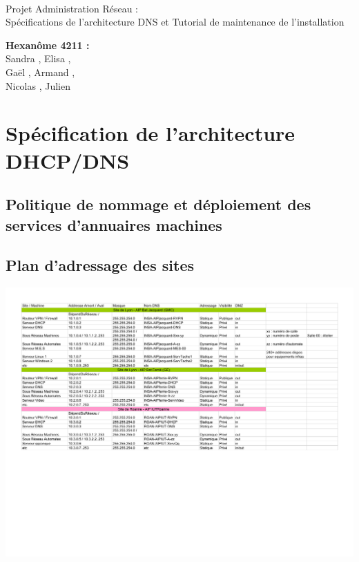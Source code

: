 \documentclass[a4paper]{article}
\begin{document}
\begin{titlepage}
	~ 
	\vfill
	\begin{center}
		\begin{Huge}
			Projet Administration Réseau : \\ Spécifications de l'architecture DNS et Tutorial de maintenance de l'installation\\
		\end{Huge}
	\vfill
		\textbf{Hexanôme 4211 :} 
			\\Sandra {}, Elisa , 
			\\Gaël , Armand , 
			\\Nicolas {}, Julien \\
	\vfill
	\end{center}
	\vfill
\end{titlepage}

\newpage
\tableofcontents
\newpage

\section{Spécification de l'architecture DHCP/DNS}

\subsection{Politique de nommage et déploiement des services d'annuaires machines }


\subsection{Plan d'adressage des sites}

\begin{center}
\includegraphics[scale=1.0]{Adressage.pdf}
\end{center}
 
\end{document}
